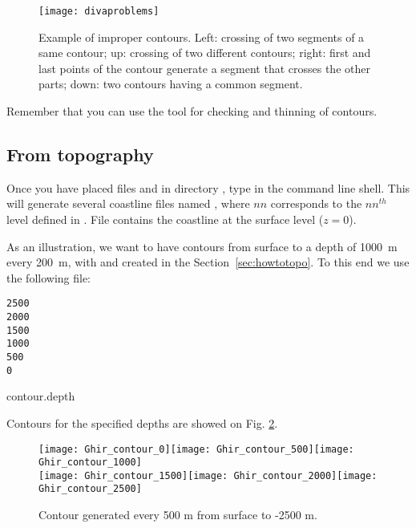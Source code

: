 \begin{figure}[H]
\centering
\parbox{.5\textwidth}{
\texttt{[image: divaproblems]}
}\parbox{.5\textwidth}{\caption[Example of improper contours.]{Example of improper contours. Left: crossing of two segments of a same contour; up: crossing of two different contours; right: first and last points of the contour generate a segment that crosses the other parts; down: two contours having a common segment.\label{divaprob}}
}
\end{figure}

Remember that you can use the tool  for checking and thinning of contours.


\subsection{From topography\label{sec:contourtopo}}


Once you have placed files  and  in directory , type  in the command line shell. This will generate several coastline files named , where $nn$ corresponds to the $nn^{th}$ level defined in . File  contains the coastline at the surface level ($z=0$).

As an illustration, we want to have contours from surface to a depth of \mbox{1000 m} every \mbox{200 m}, with  and  created in the Section~\ref{sec:howtotopo}. To this end we use the following file:

\begin{exfile}[htpb]
\begin{footnotesize}
\begin{verbatim}
2500
2000
1500
1000
500
0
\end{verbatim}
\end{footnotesize}
\caption{contour.depth\label{contourdepth}}
\end{exfile}

Contours for the specified depths are showed on Fig. \ref{fig:contourdepth}.


\begin{figure}[htpb]
\centering
\texttt{[image: Ghir\_contour\_0]}\texttt{[image: Ghir\_contour\_500]}\texttt{[image: Ghir\_contour\_1000]}\\
\texttt{[image: Ghir\_contour\_1500]}\texttt{[image: Ghir\_contour\_2000]}\texttt{[image: Ghir\_contour\_2500]}

\caption{Contour generated every 500 m from surface to -2500 m.\label{fig:contourdepth}}
\end{figure}

